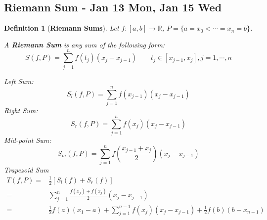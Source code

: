 \documentclass[12pt]{article}
\theoremstyle{plain}
\newtheorem{definition}{Definition}[subsection]
\begin{document}
	\newpage
	\subsection{Riemann Sum - Jan 13 Mon, Jan 15 Wed}
	\begin{definition}[\textbf{Riemann Sums}]
		Let $f:[a,b]\to \mathbb{R}$, $P=\{a=x_0<\cdots=x_n=b\}$.

		A \textbf{Riemann Sum} is any sum of the following form: 
		\[
			S(f,P) = \sum_{j=1}^n f(t_j)(x_j-x_{j-1}) \qquad 
			t_j\in[x_{j-1},x_j], j = 1,\cdots, n
		\]
		
		Left Sum: 
		\[
			S_l(f,P) = \sum_{j=1}^n f(x_{j-1}) (x_j-x_{j-1})
		\]
		Right Sum: 
		\[
			S_r(f,P) = \sum_{j=1}^n f(x_{j}) (x_j-x_{j-1})
		\]
		Mid-point Sum: 
		\[
			S_m(f,P) =\sum_{j=1}^n f(\frac{x_{j-1}+x_j}2) (x_j-x_{j-1})
		\]
		Trapezoid Sum
		\begin{align*}
			T(f,P) 
			=& \frac 12 [S_l(f)+S_r(f)]\\
			=& \sum_{j=1}^n \frac{f(x_j)+f(x_j)}2 (x_j-x_{j-1})\\
			=& \frac 12 f(a)(x_1-a) +\sum_{j=1}^{n-1} f(x_j)(x_j-x_{j-1})
			+\frac 12 f(b) (b-x_{n-1})
		\end{align*}
	\end{definition}
\end{document}
